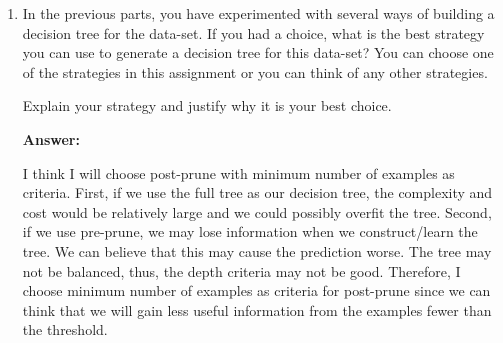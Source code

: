 \documentclass[12pt]{article}
\begin{document}
\begin{enumerate}[(a)]
\begin{enumerate}[(1)]
{\bf Answer:}

The best value of the minimum number of examples for post-prune is 60.


\item 
In the previous parts, you have experimented with several ways of building a decision tree for the data-set. If you had a choice, what is the best strategy you can use to generate a decision tree for this data-set? You can choose one of the strategies in this assignment or you can think of any other strategies. 

Explain your strategy and justify why it is your best choice.

{\bf Answer:}

I think I will choose post-prune with minimum number of examples as criteria. First, if we use the full tree as our decision tree, the complexity and cost would be relatively large and we could possibly overfit the tree. Second, if we use pre-prune, we may lose information when we construct/learn the tree. We can believe that this may cause the prediction worse. The tree may not be balanced, thus, the depth criteria may not be good. Therefore, I choose minimum number of examples as criteria for post-prune since we can think that we will gain less useful information from the examples fewer than the threshold. 


\end{enumerate}

\end{enumerate}
\end{document}
